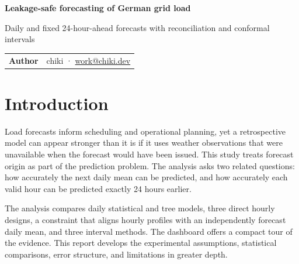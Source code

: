 \documentclass[10.5pt,a4paper]{article}
\begin{document}
\begin{titlepage}
\color{navy}
\vspace*{1.2cm}
{\fontsize{27}{33}\selectfont\bfseries Leakage-safe forecasting of German grid load\par}
\vspace{0.5cm}
{\Large Daily and fixed 24-hour-ahead forecasts with reconciliation and conformal intervals\par}
\vspace{1.2cm}
\begin{abstract}
This study asks how accurately German electricity demand can be forecast from a restricted
forecast-origin information set. We compare one-day-ahead daily models, fixed 24-hour-ahead hourly
forecasts, daily--hourly reconciliation, and three
forms of uncertainty quantification. Model choice is fixed on a chronological validation period and
a separate calibration period is used for interval construction. On the previously inspected final
period, the daily ensemble achieved \BestMAPE{} MAPE and \BestMASE{} MASE. Reconciliation reduced
hourly MAE from \RawHourlyMAE{} MW to \ReconciledHourlyMAE{} MW. A paired day-block bootstrap did
not distinguish the residual hybrid from direct LightGBM. Adaptive 90\% intervals reached
\AdaptiveCoverage{} empirical coverage, but this retrospective result does not provide a prospective guarantee.
\end{abstract}
\vfill
\begin{tabular}{@{}ll}
\textbf{Author} & chiki · \href{mailto:work@chiki.dev}{work@chiki.dev}\\
\end{tabular}
\vspace{0.8cm}
\end{titlepage}

\section{Introduction}

Load forecasts inform scheduling and operational planning, yet a retrospective model can
appear stronger than it is if it uses weather observations that were unavailable when the forecast
would have been issued. This study treats forecast origin as part of the prediction problem. The
analysis asks two related questions: how accurately the next daily mean can be predicted, and how
accurately each valid hour can be predicted exactly 24 hours earlier.

The analysis compares daily statistical and tree models, three direct hourly designs, a constraint
that aligns hourly profiles with an independently forecast daily mean, and three interval methods.
The dashboard offers a compact tour of the evidence. This report develops the experimental
assumptions, statistical comparisons, error structure, and limitations in greater depth.
\end{document}
